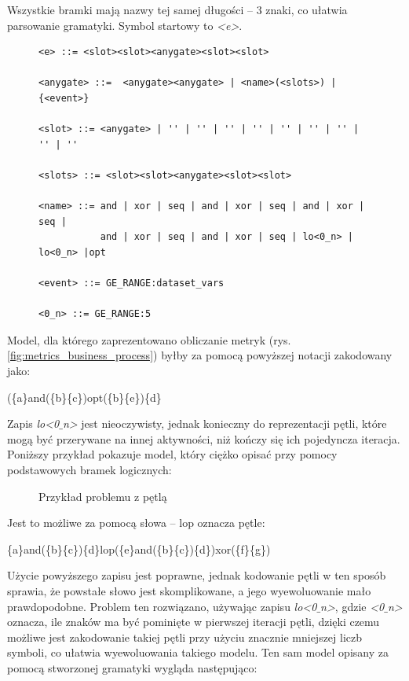 Wszystkie bramki mają nazwy tej samej długości -- 3 znaki, co ułatwia parsowanie gramatyki. Symbol startowy to \textit{<e>}.

\begin{figure}[!ht]
\lstset{caption=Proponowana gramatyka procesu biznesowego, captionpos=b}
\lstset{label=src:grammar, frame=single}
\begin{lstlisting}
<e> ::= <slot><slot><anygate><slot><slot>

<anygate> ::=  <anygate><anygate> | <name>(<slots>) | {<event>}

<slot> ::= <anygate> | '' | '' | '' | '' | '' | '' | '' | '' | ''

<slots> ::= <slot><slot><anygate><slot><slot>

<name> ::= and | xor | seq | and | xor | seq | and | xor | seq | 
           and | xor | seq | and | xor | seq | lo<0_n> | lo<0_n> |opt

<event> ::= GE_RANGE:dataset_vars

<0_n> ::= GE_RANGE:5
\end{lstlisting}
\end{figure}

Model, dla którego zaprezentowano obliczanie metryk (rys. \ref{fig:metrics_business_process}) byłby za pomocą powyższej notacji zakodowany jako:
\begin{center}
(\{a\}and(\{b\}\{c\})opt(\{b\}\{e\})\{d\}
\end{center}

Zapis \textit{lo<0$\_$n>} jest nieoczywisty, jednak konieczny do reprezentacji pętli, które mogą być przerywane na innej aktywności, niż kończy się ich pojedyncza iteracja.  
Poniższy przykład pokazuje model, który ciężko opisać przy pomocy podstawowych bramek logicznych: 
\begin{figure}[H]
	\caption{\label{fig:subcaption_example}Przykład problemu z pętlą}
\end{figure}
\noindent Jest to możliwe za pomocą słowa -- lop oznacza pętle: 
\begin{center}
\{a\}and(\{b\}\{c\})\{d\}lop(\{e\}and(\{b\}\{c\})\{d\})xor(\{f\}\{g\})
\end{center}
Użycie powyższego zapisu jest poprawne, jednak kodowanie pętli w ten sposób sprawia, że powstałe słowo jest skomplikowane, a jego wyewoluowanie mało prawdopodobne. Problem ten rozwiązano, używając zapisu  \textit{lo<0$\_$n>}, gdzie \textit{<0$\_$n>} oznacza, ile znaków ma być pominięte w pierwszej iteracji pętli, dzięki czemu możliwe jest zakodowanie takiej pętli przy użyciu znacznie mniejszej liczb symboli, co ułatwia wyewoluowania takiego modelu. Ten sam model opisany za pomocą stworzonej gramatyki wygląda następująco:

